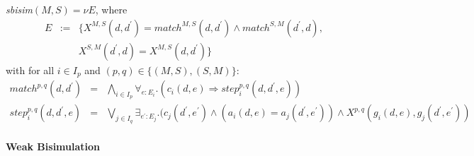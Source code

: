 \documentclass{article}
\begin{document}
\emph{sbisim}$(M,S)=\nu E$, where%
\begin{equation*}
\begin{array}{ccl}
E & := & \{X^{M,S}(d,d^{\prime })=match^{M,S}(d,d^{\prime })\wedge
match^{S,M}(d^{\prime },d), \\
&  & X^{S,M}(d^{\prime },d)=X^{M,S}(d,d^{\prime })\}%
\end{array}%
\end{equation*}%
with for all $i\in I_{p}$ and $(p,q)\in \{(M,S),(S,M)\}$:%
\begin{eqnarray*}
match^{p,q}(d,d^{\prime }) &=&\bigwedge\limits_{i\in I_{p}}\forall
_{e:E_{i}}.(c_{i}(d,e)\Rightarrow step_{i}^{p,q}(d,d^{\prime },e)) \\
step_{i}^{p,q}(d,d^{\prime },e) &=&\bigvee\limits_{j\in I_{q}}\exists
_{e^{\prime }:E_{j}}.(c_{j}(d^{\prime },e^{\prime })\wedge
(a_{i}(d,e)=a_{j}(d^{\prime },e^{\prime }))\wedge
X^{p,q}(g_{i}(d,e),g_{j}(d^{\prime },e^{\prime }))
\end{eqnarray*}

\paragraph{Weak Bisimulation}
\end{document}

